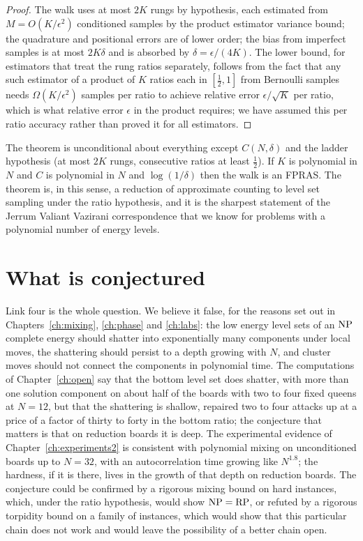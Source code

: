 \begin{proof}
The walk uses at most $2K$ rungs by hypothesis, each estimated from $M = O(K / \epsilon^2)$ conditioned samples by the product estimator variance bound; the quadrature and positional errors are of lower order; the bias from imperfect samples is at most $2K \delta$ and is absorbed by $\delta = \epsilon / (4K)$. The lower bound, for estimators that treat the rung ratios separately, follows from the fact that any such estimator of a product of $K$ ratios each in $[\tfrac12, 1]$ from Bernoulli samples needs $\Omega(K / \epsilon^2)$ samples per ratio to achieve relative error $\epsilon / \sqrt K$ per ratio, which is what relative error $\epsilon$ in the product requires; we have assumed this per ratio accuracy rather than proved it for all estimators.
\end{proof}

The theorem is unconditional about everything except $C(N, \delta)$ and the ladder hypothesis (at most $2K$ rungs, consecutive ratios at least $\tfrac12$). If $K$ is polynomial in $N$ and $C$ is polynomial in $N$ and $\log(1/\delta)$ then the walk is an FPRAS. The theorem is, in this sense, a reduction of approximate counting to level set sampling under the ratio hypothesis, and it is the sharpest statement of the Jerrum Valiant Vazirani correspondence that we know for problems with a polynomial number of energy levels.

\section{What is conjectured}

Link four is the whole question. We believe it false, for the reasons set out in Chapters~\ref{ch:mixing}, \ref{ch:phase} and \ref{ch:labs}: the low energy level sets of an $\mathrm{NP}$ complete energy should shatter into exponentially many components under local moves, the shattering should persist to a depth growing with $N$, and cluster moves should not connect the components in polynomial time. The computations of Chapter~\ref{ch:open} say that the bottom level set does shatter, with more than one solution component on about half of the boards with two to four fixed queens at $N = 12$, but that the shattering is shallow, repaired two to four attacks up at a price of a factor of thirty to forty in the bottom ratio; the conjecture that matters is that on reduction boards it is deep. The experimental evidence of Chapter~\ref{ch:experiments2} is consistent with polynomial mixing on unconditioned boards up to $N = 32$, with an autocorrelation time growing like $N^{1.8}$; the hardness, if it is there, lives in the growth of that depth on reduction boards. The conjecture could be confirmed by a rigorous mixing bound on hard instances, which, under the ratio hypothesis, would show $\mathrm{NP} = \mathrm{RP}$, or refuted by a rigorous torpidity bound on a family of instances, which would show that this particular chain does not work and would leave the possibility of a better chain open.

